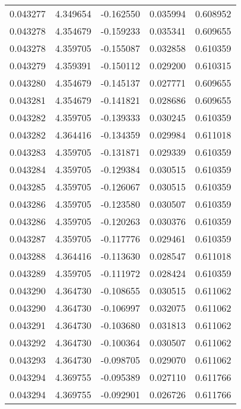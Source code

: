 \begin{tabular}{lrrrr}
0.043277    &  4.349654 & -0.162550 &  0.035994 &             0.608952 \\
0.043278    &  4.354679 & -0.159233 &  0.035341 &             0.609655 \\
0.043278    &  4.359705 & -0.155087 &  0.032858 &             0.610359 \\
0.043279    &  4.359391 & -0.150112 &  0.029200 &             0.610315 \\
0.043280    &  4.354679 & -0.145137 &  0.027771 &             0.609655 \\
0.043281    &  4.354679 & -0.141821 &  0.028686 &             0.609655 \\
0.043282    &  4.359705 & -0.139333 &  0.030245 &             0.610359 \\
0.043282    &  4.364416 & -0.134359 &  0.029984 &             0.611018 \\
0.043283    &  4.359705 & -0.131871 &  0.029339 &             0.610359 \\
0.043284    &  4.359705 & -0.129384 &  0.030515 &             0.610359 \\
0.043285    &  4.359705 & -0.126067 &  0.030515 &             0.610359 \\
0.043286    &  4.359705 & -0.123580 &  0.030507 &             0.610359 \\
0.043286    &  4.359705 & -0.120263 &  0.030376 &             0.610359 \\
0.043287    &  4.359705 & -0.117776 &  0.029461 &             0.610359 \\
0.043288    &  4.364416 & -0.113630 &  0.028547 &             0.611018 \\
0.043289    &  4.359705 & -0.111972 &  0.028424 &             0.610359 \\
0.043290    &  4.364730 & -0.108655 &  0.030515 &             0.611062 \\
0.043290    &  4.364730 & -0.106997 &  0.032075 &             0.611062 \\
0.043291    &  4.364730 & -0.103680 &  0.031813 &             0.611062 \\
0.043292    &  4.364730 & -0.100364 &  0.030507 &             0.611062 \\
0.043293    &  4.364730 & -0.098705 &  0.029070 &             0.611062 \\
0.043294    &  4.369755 & -0.095389 &  0.027110 &             0.611766 \\
0.043294    &  4.369755 & -0.092901 &  0.026726 &             0.611766 \\

\end{tabular}
